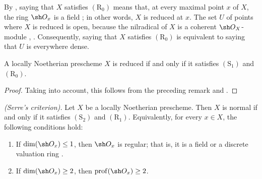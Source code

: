 \begin{env}[5.8.4]
\label{IV.5.8.4}
By , saying that $X$ satisfies $(\mathrm R_0)$ means
that, at every maximal point $x$ of $X$, the ring $\sh O_x$ is a
field ; in other words, $X$ is reduced at $x$.
The set $U$ of points where $X$ is reduced is open, because the
nilradical of $X$ is a coherent $\sh O_X$-module
, .  Consequently, saying that
$X$ satisfies $(\mathrm R_0)$ is equivalent to saying that $U$ is
everywhere dense.
\end{env}


\begin{proposition}[5.8.5]
\label{IV.5.8.5}
A locally Noetherian prescheme $X$ is reduced if and only if it
satisfies $(\mathrm S_1)$ and $(\mathrm R_0)$.
\end{proposition}

\begin{proof}
Taking  into account, this follows from the preceding
remark and .
\end{proof}

\begin{theorem}[5.8.6]
\label{IV.5.8.6}
\emph{(Serre's criterion).}
Let $X$ be a locally Noetherian prescheme.  Then $X$ is normal if and
only if it satisfies $(\mathrm S_2)$ and $(\mathrm R_1)$.  Equivalently,
for every $x\in X$, the following conditions hold:
\begin{enumerate}[{\rm(i)}]
  \item\label{IV.5.8.6.i}
    If $\dim(\sh O_x)\leq1$, then $\sh O_x$ is regular; that is, it is
    a field or a discrete valuation ring .
  \item\label{IV.5.8.6.ii}
    If $\dim(\sh O_x)\geq2$, then
    $\operatorname{prof}(\sh O_x)\geq2$.
\end{enumerate}
\end{theorem}

